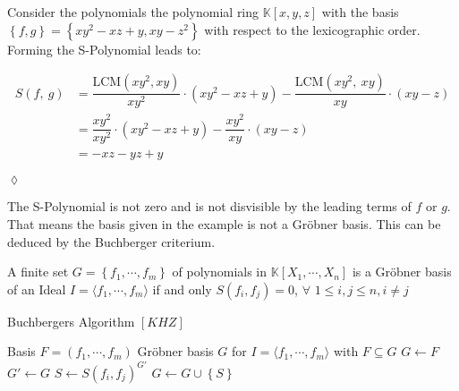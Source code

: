 \newpage

\begin{env_example}\normalfont
Consider the polynomials the polynomial ring $\mathbb{K}\left[ x,y,z\right] $ with
the basis $\left\lbrace f,g\right\rbrace = \left\lbrace xy^{2}-xz+y,xy-z^{2} \right\rbrace $ with respect to the lexicographic order.\\
Forming the S-Polynomial leads to:

\begin{align*}
 S \left(f,~g\right) &= \dfrac{\textrm{LCM}\left( xy^{2}, xy \right) } {xy^{2} } \cdot \left(  xy^{2}-xz+y\right) - \dfrac{\textrm{LCM}\left( xy^{2},~xy \right) } {xy } \cdot \left( xy-z \right) \\ 
 &= \dfrac{xy^{2}}{xy^{2}} \cdot \left( xy^{2}-xz+y\right) - \dfrac{xy^{2}}{xy} \cdot \left( xy-z\right) \\
 &= -xz-yz+y 
\end{align*}


\begin{flushright}
$\lozenge$
\end{flushright} 
\end{env_example}

The S-Polynomial is not zero and is not disvisible by the leading terms of $f$ or $g$. That means the basis given in the example is not a Gröbner basis. This can be deduced by the Buchberger criterium.

\begin{env_definition}
\cite{KHZ} A finite set $G = \left\lbrace f_{1}, \cdots , f_{m} \right\rbrace$ of polynomials in $ \mathbb{K}\left[X_{1}, \cdots, X_{n}\right] $ is a Gröbner basis of an Ideal 
$I = \langle f_{1}, \cdots , f_{m} \rangle $ if and only $S\left( f_{i},f_{j}\right) = 0$, $ \forall$  $1 \leq i,j \leq n, i\neq j $

\end{env_definition}

\begin{algorithm}
\caption{Buchbergers Algorithm $[KHZ]$}
\label{alg:buchberger}
\begin{algorithmic}[1]
\Require Basis $F = \left( f_{1}, \cdots, f_{m} \right)  $
\Ensure Gröbner basis $G$ for $I = \langle f_{1}, \cdots, f_{m} \rangle $ with $ F \subseteq G $
\State $G \gets F$
\Repeat
\State $G'\gets G $
\State $S \gets S\left( f_{i},f_{j} \right)^{G'}  $ 
\State $G \gets G \cup \left\lbrace S\right\rbrace $
\EndIf
\EndFor
{}

\end{algorithmic}
\end{algorithm}

